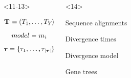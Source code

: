 \begin{frame}
\begin{columns}[c]
        \begin{onlyenv}<11-13>
            \begin{minipage}[c][0.5\textheight][c]{\linewidth}
                \begin{displaybox}[0.95\linewidth]
                    \begin{minipage}[c][0.45\textheight][c]{0.95\linewidth}
                        \[
                            \mathbf{T_{}} = (T_{1},\ldots,T_{Y_{}})
                        \]\vspace{0mm}
                        \[
                            model = m_{i}
                        \]\vspace{0mm}
                        \[
                            \boldsymbol{\tau_{}} = \{\tau_{1},\ldots,\tau_{\lvert \boldsymbol{\tau_{}} \rvert}\}
                        \]\vspace{0mm}
                    \end{minipage}
                \end{displaybox}
            \end{minipage}
        \end{onlyenv}
        \begin{onlyenv}<14>
            \begin{minipage}[c][0.5\textheight][c]{\linewidth}
                \begin{mydescription}
                    \item[\alignmentVector] Sequence alignments
                    \item[\divTimeMapVector] Divergence times
                    \item[\divModel{}] Divergence model
                    \item[\geneTreeVector] Gene trees

\end{mydescription}
\end{minipage}
\end{onlyenv}
\end{columns}
\end{frame}
